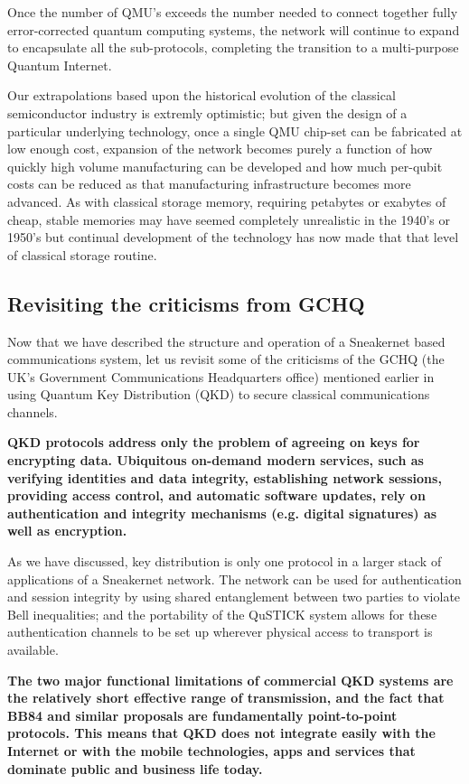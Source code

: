 \documentclass[twocolumn, aps, rmp, amsmath, amssymb, nofootinbib, superscriptaddress, longbibliography, floatfix, table-of-contents, eqsecnum]{revtex4-2}
\begin{document}
Once the number of QMU's exceeds the number needed to connect together fully error-corrected quantum computing systems, the network will continue to expand to encapsulate all the sub-protocols, completing the transition to a multi-purpose Quantum Internet. 

Our extrapolations based upon the historical evolution of the classical semiconductor industry is extremly optimistic; but given the design of a particular underlying technology, once a single QMU chip-set can be fabricated at low enough cost, expansion of the network becomes purely a function of how quickly high volume manufacturing can be developed and how much per-qubit costs can be reduced as that manufacturing infrastructure becomes more advanced. As with classical storage memory, requiring petabytes or exabytes of cheap, stable memories may have seemed completely unrealistic in the 1940's or 1950's but continual development of the technology has now made that that level of classical storage routine.

\subsection{Revisiting the criticisms from GCHQ}

Now that we have described the structure and operation of a Sneakernet based communications system, let us revisit some of the criticisms of the GCHQ (the UK's Government Communications Headquarters office) mentioned earlier in using Quantum Key Distribution (QKD) to secure classical communications channels. 

\textbf{QKD protocols address only the problem of agreeing on keys for encrypting data. Ubiquitous on-demand modern services, such as verifying identities and data integrity, establishing network sessions, providing access control, and automatic software updates, rely on authentication and integrity mechanisms (e.g. digital signatures) as well as encryption.}

As we have discussed, key distribution is only one protocol in a larger stack of applications of a Sneakernet network. The network can be used for authentication and session integrity by using shared entanglement between two parties to violate Bell inequalities; and the portability of the QuSTICK system allows for these authentication channels to be set up wherever physical access to transport is available.

\textbf{The two major functional limitations of commercial QKD systems are the relatively short effective range of transmission, and the fact that BB84 and similar proposals are fundamentally point-to-point protocols. This means that QKD does not integrate easily with the Internet or with the mobile technologies, apps and services that dominate public and business life today.}
\end{document}
